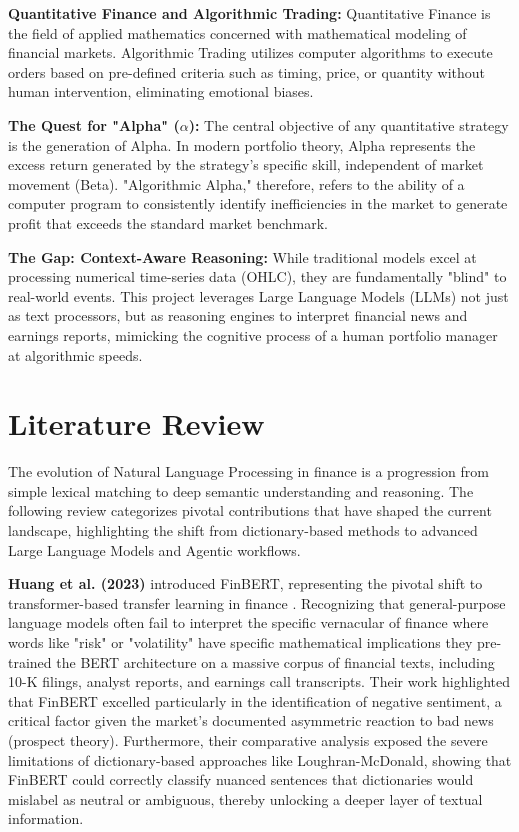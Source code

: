 \documentclass[12pt, a4paper]{report}
\begin{document}
\textbf{Quantitative Finance and Algorithmic Trading:} Quantitative Finance is the field of applied mathematics concerned with mathematical modeling of financial markets. Algorithmic Trading utilizes computer algorithms to execute orders based on pre-defined criteria such as timing, price, or quantity without human intervention, eliminating emotional biases.

\textbf{The Quest for "Alpha" ($\alpha$):} The central objective of any quantitative strategy is the generation of Alpha. In modern portfolio theory, Alpha represents the excess return generated by the strategy’s specific skill, independent of market movement (Beta). "Algorithmic Alpha," therefore, refers to the ability of a computer program to consistently identify inefficiencies in the market to generate profit that exceeds the standard market benchmark.

\textbf{The Gap: Context-Aware Reasoning:} While traditional models excel at processing numerical time-series data (OHLC), they are fundamentally "blind" to real-world events. This project leverages Large Language Models (LLMs) not just as text processors, but as reasoning engines to interpret financial news and earnings reports, mimicking the cognitive process of a human portfolio manager at algorithmic speeds.

\section{Literature Review}

The evolution of Natural Language Processing in finance is a progression from simple lexical matching to deep semantic understanding and reasoning. The following review categorizes pivotal contributions that have shaped the current landscape, highlighting the shift from dictionary-based methods to advanced Large Language Models and Agentic workflows.

\textbf{Huang et al. (2023)} introduced FinBERT, representing the pivotal shift to transformer-based transfer learning in finance \cite{huang2023}. Recognizing that general-purpose language models often fail to interpret the specific vernacular of finance where words like "risk" or "volatility" have specific mathematical implications they pre-trained the BERT architecture on a massive corpus of financial texts, including 10-K filings, analyst reports, and earnings call transcripts. Their work highlighted that FinBERT excelled particularly in the identification of negative sentiment, a critical factor given the market's documented asymmetric reaction to bad news (prospect theory). Furthermore, their comparative analysis exposed the severe limitations of dictionary-based approaches like Loughran-McDonald, showing that FinBERT could correctly classify nuanced sentences that dictionaries would mislabel as neutral or ambiguous, thereby unlocking a deeper layer of textual information.
\end{document}
